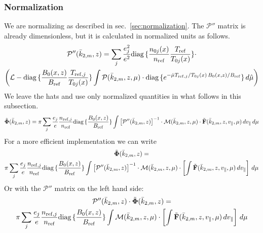 \subsubsection{Normalization}
\label{sec:norm_field1}
We are normalizing as described in sec.~\ref{sec:normalization}. The
$\mathcal{P}''$ matrix is already dimensionless, but it is calculated
in normalized units as follows.
\begin{multline*}
  \mathcal{P}''(\bar{k}_{2,m},z) = \sum_j\frac{e_j^2}{e^2}
  \mbox{diag}\,\{\frac{n_{0j}(x)}{n_{\mathrm{ref}}}\frac{T_{\mathrm{ref}}}{T_{0j}(x)}\}\cdot\\
  \left(
    \mathcal{L}
    -\mbox{diag}\,\{\frac{B_0(x,z)}{B_{\mathrm{ref}}}\frac{T_{\mathrm{ref},j}}{T_{0j}(x)}\} \int \mathcal{P}(\bar{k}_{2,m},z,\mu)
    \cdot\mbox{diag}\,\{e^{-\hat{\mu}T_{\mathrm{ref},j}/T_{0j}(x)\, B_0(x,z)/B_{\mathrm{ref}}}\}\,d\hat{\mu}
  \right)
\end{multline*}
We leave the hats and use only normalized quantities in what follows in this
subsection. 
\begin{multline*}
  \tilde{\mathbf{\Phi}}(\bar{k}_{2,m},z)
  = \pi\sum_j \frac{e_j}{e}\frac{n_{\mathrm{ref},j}}{n_{\mathrm{ref}}}
  \mbox{diag}\,\{\frac{B_0(x,z)}{B_{\mathrm{ref}}}\}\int \left[\mathcal{P}''(\bar{k}_{2,m},z)\right]^{-1}\cdot\mathcal{M}(\bar{k}_{2,m},z,\mu)
  \cdot\tilde{\mathbf{F}}(\bar{k}_{2,m},z,v_\|,\mu)\,dv_\|\,d\mu
\end{multline*}
For a more efficient implementation we can write
\begin{multline*}
  \tilde{\mathbf{\Phi}}(\bar{k}_{2,m},z) =\\
  \pi\sum_j \frac{e_j}{e}\frac{n_{\mathrm{ref},j}}{n_{\mathrm{ref}}}
  \mbox{diag}\,\{\frac{B_0(x,z)}{B_{\mathrm{ref}}}\}\int \left[\mathcal{P}''(\bar{k}_{2,m},z)\right]^{-1}\cdot\mathcal{M}(\bar{k}_{2,m},z,\mu)
  \cdot\left[
    \int\tilde{\mathbf{F}}(\bar{k}_{2,m},z,v_\|,\mu)\,dv_\|
  \right]\,d\mu
\end{multline*}
Or with the $\mathcal{P}''$ matrix on the left hand side:
\begin{multline*}
  \mathcal{P}''(\bar{k}_{2,m},z)\cdot\tilde{\mathbf{\Phi}}(\bar{k}_{2,m},z) =\\
  \pi\sum_j \frac{e_j}{e}\frac{n_{\mathrm{ref},j}}{n_{\mathrm{ref}}}
  \mbox{diag}\,\{\frac{B_0(x,z)}{B_{\mathrm{ref}}}\}\int \mathcal{M}(\bar{k}_{2,m},z,\mu)
  \cdot\left[
    \int\tilde{\mathbf{F}}(\bar{k}_{2,m},z,v_\|,\mu)\,dv_\|
  \right]\,d\mu
\end{multline*}


